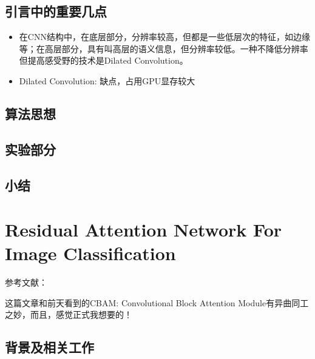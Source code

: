 \subsection{引言中的重要几点}

\begin{itemize}
\item 在CNN结构中，在底层部分，分辨率较高，但都是一些低层次的特征，如边缘等；在高层部分，具有叫高层的语义信息，但分辨率较低。一种不降低分辨率但提高感受野的技术是Dilated Convolution。
\item Dilated Convolution: 缺点，占用GPU显存较大
\end{itemize}

\subsection{算法思想}



\subsection{实验部分}

\subsection{小结}

\section{Residual Attention Network For Image Classification}

参考文献：

这篇文章和前天看到的CBAM: Convolutional Block Attention Module有异曲同工之妙，而且，感觉正式我想要的！  

\subsection{背景及相关工作}

